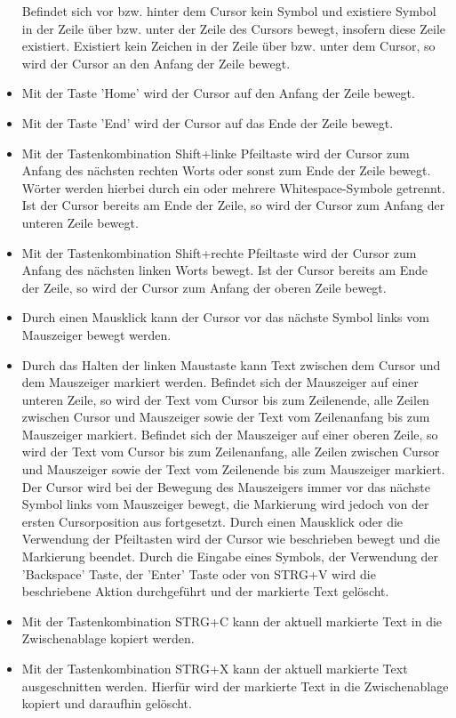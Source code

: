 \documentclass[parskip=full,11pt,twoside]{scrartcl}
\begin{document}
\begin{itemize}
	Befindet sich vor bzw. hinter dem Cursor kein Symbol und existiere Symbol in der Zeile über bzw. unter der Zeile des Cursors bewegt, insofern diese Zeile existiert.
	Existiert kein Zeichen in der Zeile über bzw. unter dem Cursor, so wird der Cursor an den Anfang der Zeile bewegt.
	\item Mit der Taste 'Home' wird der Cursor auf den Anfang der Zeile bewegt.
	\item Mit der Taste 'End' wird der Cursor auf das Ende der Zeile bewegt.
	\item Mit der Tastenkombination Shift+linke Pfeiltaste wird der Cursor zum Anfang des nächsten rechten Worts oder sonst zum Ende der Zeile bewegt. Wörter werden hierbei durch ein oder mehrere Whitespace-Symbole getrennt. Ist der Cursor bereits am Ende der Zeile, so wird der Cursor zum Anfang der unteren Zeile bewegt.
	\item Mit der Tastenkombination Shift+rechte Pfeiltaste wird der Cursor zum Anfang des nächsten linken Worts bewegt. Ist der Cursor bereits am Ende der Zeile, so wird der Cursor zum Anfang der oberen Zeile bewegt.
	\item Durch einen Mausklick kann der Cursor vor das nächste Symbol links vom Mauszeiger bewegt werden.
	\item Durch das Halten der linken Maustaste kann Text zwischen dem Cursor und dem Mauszeiger markiert werden. 
	Befindet sich der Mauszeiger auf einer unteren Zeile, so wird der Text vom Cursor bis zum Zeilenende, alle Zeilen zwischen Cursor und Mauszeiger sowie der Text vom Zeilenanfang bis zum Mauszeiger markiert. 
	Befindet sich der Mauszeiger auf einer oberen Zeile, so wird der Text vom Cursor bis zum Zeilenanfang, alle Zeilen zwischen Cursor und Mauszeiger sowie der Text vom Zeilenende bis zum Mauszeiger markiert. 
	Der Cursor wird bei der Bewegung des Mauszeigers immer vor das nächste Symbol links vom Mauszeiger bewegt, die Markierung wird jedoch von der ersten Cursorposition aus fortgesetzt.
	Durch einen Mausklick oder die Verwendung der Pfeiltasten wird der Cursor wie beschrieben bewegt und die Markierung beendet.
	Durch die Eingabe eines Symbols, der Verwendung der 'Backspace' Taste, der 'Enter' Taste oder von STRG+V wird die beschriebene Aktion durchgeführt und der markierte Text gelöscht.
	\item Mit der Tastenkombination STRG+C kann der aktuell markierte Text in die Zwischenablage kopiert werden.
	\item Mit der Tastenkombination STRG+X kann der aktuell markierte Text ausgeschnitten werden. Hierfür wird der markierte Text in die Zwischenablage kopiert und daraufhin gelöscht.

\end{itemize}
\end{document}
